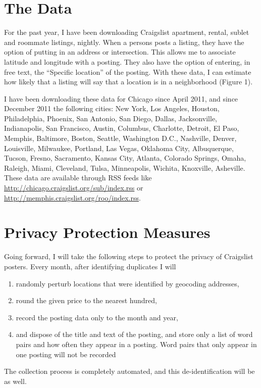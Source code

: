 \documentclass[11pt,letterpaper,oneside]{article}
\begin{document}
\section*{The Data}
For the past year, I have been downloading Craigslist apartment,
rental, sublet and roommate listings, nightly. When a persons posts a
listing, they have the option of putting in an address or
intersection. This allows me to associate latitude and longitude with
a posting. They also have the option of entering, in free text, the
``Specific location'' of the posting.  With these data, I can estimate
how likely that a listing will say that a location is in a
neighborhood (Figure 1).

I have been downloading these data for Chicago since April 2011, and
since December 2011 the following cities: New York, Los Angeles,
Houston, Philadelphia, Phoenix, San Antonio, San Diego, Dallas,
Jacksonville, Indianapolis, San Francisco, Austin, Columbus,
Charlotte, Detroit, El Paso, Memphis, Baltimore, Boston, Seattle,
Washington D.C., Nashville, Denver, Louisville, Milwaukee, Portland,
Las Vegas, Oklahoma City, Albuquerque, Tucson, Fresno, Sacramento,
Kansas City, Atlanta, Colorado Springs, Omaha, Raleigh, Miami,
Cleveland, Tulsa, Minneapolis, Wichita, Knoxville, Asheville. These
data are available through RSS feeds like
\url{http://chicago.craigslist.org/sub/index.rss} or
\url{http://memphis.craigslist.org/roo/index.rss}.

\section*{Privacy Protection Measures}
Going forward, I will take the following steps to protect the privacy
of Craigslist posters. Every month, after identifying duplicates I will 
\begin{enumerate}
\item{randomly perturb locations that were identified by geocoding addresses,}
\item{round the given price to the nearest hundred,}
\item{record the posting data only to the month and year,}
\item{and dispose of the title and text of the posting, and store only
    a list of word pairs and how often they appear in a posting. Word
    pairs that only appear in one posting will not be recorded}
\end{enumerate}

The collection process is completely automated, and this
de-identification will be as well.
\end{document}
